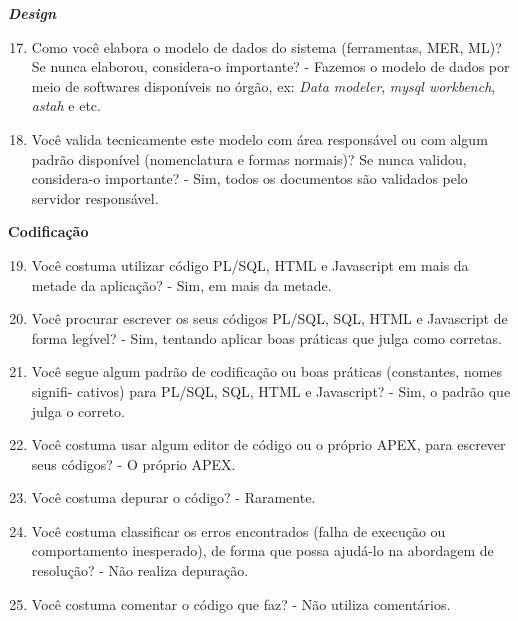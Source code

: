 \begin{anexosenv}
\textbf{\textit{Design}}

\begin{enumerate}
\setcounter{enumi}{16}
\item Como você elabora o modelo de dados do sistema (ferramentas, MER, ML)? Se nunca
elaborou, considera-o importante?\newline
- Fazemos o modelo de dados por meio de softwares disponíveis no órgão, ex: \textit{Data modeler}, \textit{mysql workbench}, \textit{astah} e etc.
\item Você valida tecnicamente este modelo com área responsável ou com algum padrão
disponível (nomenclatura e formas normais)? Se nunca validou, considera-o importante?\newline
- Sim, todos os documentos são validados pelo servidor responsável.
\end{enumerate}

\textbf{Codificação}

\begin{enumerate}
\setcounter{enumi}{18}
\item Você costuma utilizar código PL/SQL, HTML e Javascript em mais da metade da
aplicação?\newline
- Sim, em mais da metade.
\item Você procurar escrever os seus códigos PL/SQL, SQL, HTML e Javascript de forma
legível?\newline
- Sim, tentando aplicar boas práticas que julga como corretas.
\item Você segue algum padrão de codificação ou boas práticas (constantes, nomes signifi-
cativos) para PL/SQL, SQL, HTML e Javascript?\newline
- Sim, o padrão que julga o correto.
\item Você costuma usar algum editor de código ou o próprio APEX, para escrever seus
códigos?\newline
- O próprio APEX.
\item Você costuma depurar o código?\newline
- Raramente.
\item Você costuma classificar os erros encontrados (falha de execução ou comportamento
inesperado), de forma que possa ajudá-lo na abordagem de resolução?\newline
- Não realiza depuração.
\item Você costuma comentar o código que faz?\newline
- Não utiliza comentários.
\end{enumerate}


\end{anexosenv}
